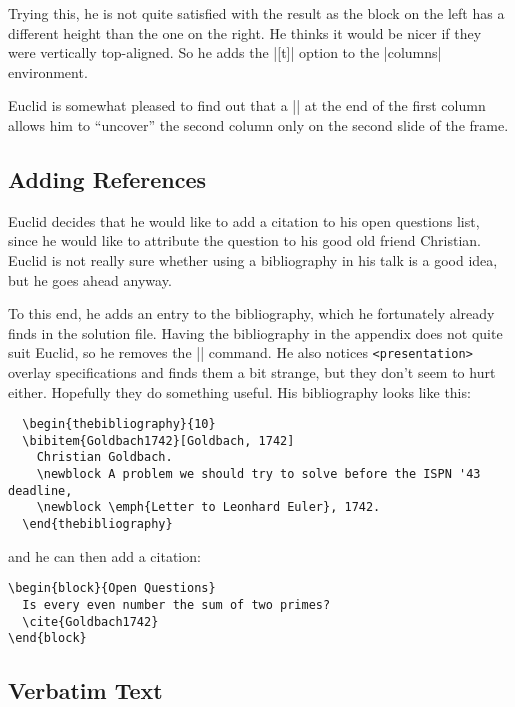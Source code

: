 Trying this, he is not quite satisfied with the result as the block on the left has a different height than the one on the right. He thinks it would be nicer if they were vertically top-aligned. So he adds the |[t]| option to the |columns| environment.

Euclid is somewhat pleased to find out that a |\pause| at the end of the first column allows him to ``uncover'' the second column only on the second slide of the frame.


\subsection{Adding References}

Euclid decides that he would like to add a citation to his open questions list, since he would like to attribute the question to his good old friend Christian. Euclid is not really sure whether using a bibliography in his talk is a good idea, but he goes ahead anyway.

To this end, he adds an entry to the bibliography, which he fortunately already finds in the solution file. Having the bibliography in the appendix does not quite suit Euclid, so he removes the |\appendix| command. He also notices \Verb|<presentation>| overlay specifications and finds them a bit strange, but they don't seem to hurt either. Hopefully they do something useful. His bibliography looks like this:
\begin{verbatim}
  \begin{thebibliography}{10}
  \bibitem{Goldbach1742}[Goldbach, 1742]
    Christian Goldbach.
    \newblock A problem we should try to solve before the ISPN '43 deadline,
    \newblock \emph{Letter to Leonhard Euler}, 1742.
  \end{thebibliography}
\end{verbatim}

and he can then add a citation:
\begin{verbatim}
\begin{block}{Open Questions}
  Is every even number the sum of two primes?
  \cite{Goldbach1742}
\end{block}
\end{verbatim}


\subsection{Verbatim Text}

